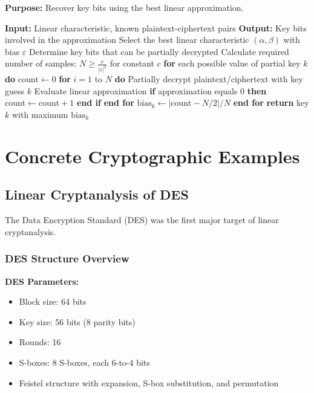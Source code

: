 \documentclass[12pt,a4paper]{article}
\newcommand{\bias}{\varepsilon}
\begin{document}
\begin{algorithmbox}[title=Matsui's Algorithm 2]
\textbf{Purpose:} Recover key bits using the best linear approximation.

\begin{algorithmic}
\State \textbf{Input:} Linear characteristic, known plaintext-ciphertext pairs
\State \textbf{Output:} Key bits involved in the approximation
\State
\State Select the best linear characteristic $(\alpha, \beta)$ with bias $\bias$
\State Determine key bits that can be partially decrypted
\State Calculate required number of samples: $N \geq \frac{c}{|\bias|^2}$ for constant $c$
\State
\State \textbf{for} each possible value of partial key $k$ \textbf{do}
\State \quad $\text{count} \leftarrow 0$
\State \quad \textbf{for} $i = 1$ to $N$ \textbf{do}
\State \quad \quad Partially decrypt plaintext/ciphertext with key guess $k$
\State \quad \quad Evaluate linear approximation
\State \quad \quad \textbf{if} approximation equals 0 \textbf{then}
\State \quad \quad \quad $\text{count} \leftarrow \text{count} + 1$
\State \quad \quad \textbf{end if}
\State \quad \textbf{end for}
\State \quad $\text{bias}_{k} \leftarrow |\text{count} - N/2|/N$
\State \textbf{end for}
\State
\State \textbf{return} key $k$ with maximum $\text{bias}_{k}$
\end{algorithmic}
\end{algorithmbox}

\section{Concrete Cryptographic Examples}

\subsection{Linear Cryptanalysis of DES}

The Data Encryption Standard (DES) was the first major target of linear cryptanalysis.

\subsubsection{DES Structure Overview}

\begin{mathematicsbox}
\textbf{DES Parameters:}
\begin{itemize}
    \item Block size: 64 bits
    \item Key size: 56 bits (8 parity bits)
    \item Rounds: 16
    \item S-boxes: 8 S-boxes, each 6-to-4 bits
    \item Feistel structure with expansion, S-box substitution, and permutation
\end{itemize}
\end{mathematicsbox}
\end{document}
